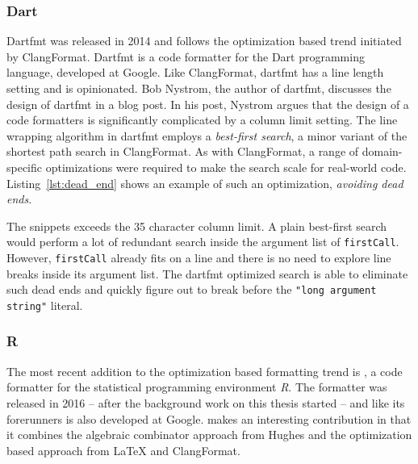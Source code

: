 \subsubsection{Dart}
Dartfmt\autocite{nystrom_dart_style_2014} was released in 2014 and follows the optimization based trend initiated by ClangFormat.
Dartfmt is a code formatter for the Dart programming language, developed at Google.
Like ClangFormat, dartfmt has a line length setting and is opinionated.
Bob Nystrom, the author of dartfmt, discusses the design of dartfmt in a blog post\autocite{nystrom_hardest_2015}.
In his post, Nystrom argues that the design of a code formatters is significantly complicated by a column limit setting.
The line wrapping algorithm in dartfmt employs a \emph{best-first search}\autocite{pearl_heuristics:_1984},
a minor variant of the shortest path search in ClangFormat.
As with ClangFormat, a range of domain-specific optimizations were required to make the search scale for real-world code.
Listing~\ref{lst:dead_end} shows an example of such an optimization, \emph{avoiding dead ends}.

The snippets exceeds the 35 character column limit.
A plain best-first search would perform a lot of redundant search inside the argument list of \texttt{firstCall}.
However, \texttt{firstCall} already fits on a line and there is no need to explore line breaks inside its argument list.
The dartfmt optimized search is able to eliminate such dead ends and quickly figure out to break before the \texttt{"long argument string"} literal.

\subsubsection{R}
The most recent addition to the optimization based formatting trend is \rfmt\autocite{yelland_new_2016},
a code formatter for the statistical programming environment \emph{R}.
The formatter was released in 2016 -- after the background work on this thesis started -- and like its forerunners is also developed at Google.
\rfmt{} makes an interesting contribution in that it combines the algebraic combinator approach from Hughes\autocite{hughes_design_1995} and the optimization based approach from \LaTeX{} and ClangFormat.

